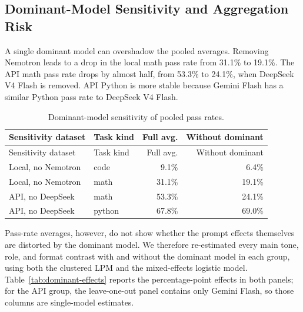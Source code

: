 \documentclass{llncs}
\begin{document}
\subsection{Dominant-Model Sensitivity and Aggregation Risk}\label{dominant-model-sensitivity-and-aggregation-risk}

A single dominant model can overshadow the pooled averages. Removing Nemotron leads to a drop in the local math pass rate from 31.1\% to 19.1\%. The API math pass rate drops by almost half, from 53.3\% to 24.1\%, when DeepSeek V4 Flash is removed. API Python is more stable because Gemini Flash has a similar Python pass rate to DeepSeek V4 Flash.

\begin{longtable}[]{@{}llrr@{}}
\caption{Dominant-model sensitivity of pooled pass rates.}\tabularnewline
\toprule\noalign{}
Sensitivity dataset & Task kind & Full avg. & Without dominant \\
\midrule\noalign{}
\endfirsthead
\toprule\noalign{}
Sensitivity dataset & Task kind & Full avg. & Without dominant \\
\midrule\noalign{}
\endhead
\bottomrule\noalign{}
\endlastfoot
Local, no Nemotron & code & 9.1\% & 6.4\% \\
Local, no Nemotron & math & 31.1\% & 19.1\% \\
API, no DeepSeek & math & 53.3\% & 24.1\% \\
API, no DeepSeek & python & 67.8\% & 69.0\% \\
\end{longtable}

Pass-rate averages, however, do not show whether the prompt effects themselves are distorted by the dominant model. We therefore re-estimated every main tone, role, and format contrast with and without the dominant model in each group, using both the clustered LPM and the mixed-effects logistic model. Table~\ref{tab:dominant-effects} reports the percentage-point effects in both panels; for the API group, the leave-one-out panel contains only Gemini Flash, so those columns are single-model estimates.
\end{document}

